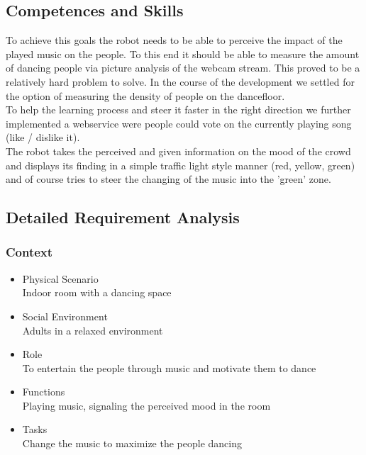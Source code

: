 \documentclass{article}
\begin{document}
\subsection{Competences and Skills}

To achieve this goals the robot needs to be able to perceive the impact of the played music on the people. To this end it should be able to measure the amount of dancing people via picture analysis of the webcam stream. This proved to be a relatively hard problem to solve. In the course of the development we settled for the option of measuring the density of people on the dancefloor.\\
To help the learning process and steer it faster in the right direction we further implemented a webservice were people could vote on the currently playing song (like / dislike it). \\
The robot takes the perceived and given information on the mood of the crowd and displays its finding in a simple traffic light style manner (red, yellow, green) and of course tries to steer the changing of the music into the 'green' zone.

\subsection{Detailed Requirement Analysis}

\subsubsection{Context}
\begin{itemize}
    \item Physical Scenario\\
Indoor room with a dancing space

\item Social Environment\\
    Adults in a relaxed environment

\item Role\\
    To entertain the people through music and motivate them to dance

\item Functions\\
    Playing music, signaling the perceived mood in the room

\item Tasks\\
    Change the music to maximize the people dancing

\end{itemize}
\end{document}
